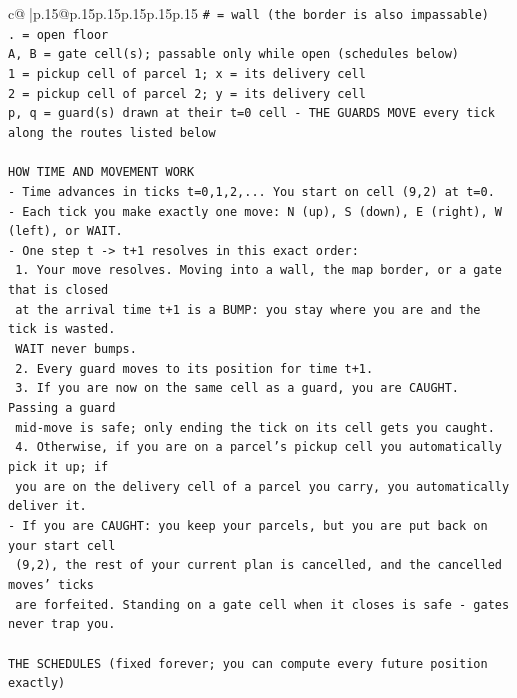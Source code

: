 \documentclass{article}
\begin{document}
{\begin{supertabular}{c@{$\;$}|p{.15\linewidth}@{}p{.15\linewidth}p{.15\linewidth}p{.15\linewidth}p{.15\linewidth}p{.15\linewidth}}
{{{\texttt{\# = wall (the border is also impassable)} \\
\texttt{. = open floor} \\
\texttt{A, B = gate cell(s); passable only while open (schedules below)} \\
\texttt{1 = pickup cell of parcel 1; x = its delivery cell} \\
\texttt{2 = pickup cell of parcel 2; y = its delivery cell} \\
\texttt{p, q = guard(s) drawn at their t=0 cell {-} THE GUARDS MOVE every tick along the routes listed below} \\
\\ 
\texttt{HOW TIME AND MOVEMENT WORK} \\
\texttt{{-} Time advances in ticks t=0,1,2,... You start on cell (9,2) at t=0.} \\
\texttt{{-} Each tick you make exactly one move: N (up), S (down), E (right), W (left), or WAIT.} \\
\texttt{{-} One step t {-}> t+1 resolves in this exact order:} \\
\texttt{  1. Your move resolves. Moving into a wall, the map border, or a gate that is closed} \\
\texttt{     at the arrival time t+1 is a BUMP: you stay where you are and the tick is wasted.} \\
\texttt{     WAIT never bumps.} \\
\texttt{  2. Every guard moves to its position for time t+1.} \\
\texttt{  3. If you are now on the same cell as a guard, you are CAUGHT. Passing a guard} \\
\texttt{     mid{-}move is safe; only ending the tick on its cell gets you caught.} \\
\texttt{  4. Otherwise, if you are on a parcel's pickup cell you automatically pick it up; if} \\
\texttt{     you are on the delivery cell of a parcel you carry, you automatically deliver it.} \\
\texttt{{-} If you are CAUGHT: you keep your parcels, but you are put back on your start cell} \\
\texttt{  (9,2), the rest of your current plan is cancelled, and the cancelled moves' ticks} \\
\texttt{  are forfeited. Standing on a gate cell when it closes is safe {-} gates never trap you.} \\
\\ 
\texttt{THE SCHEDULES (fixed forever; you can compute every future position exactly)} \\
}}}
\end{supertabular}}
\end{document}
